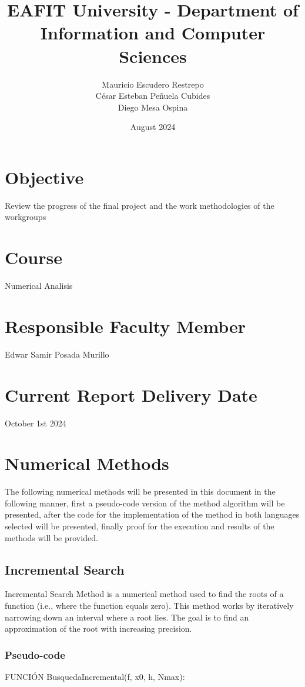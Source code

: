 \documentclass{article}
\title{EAFIT University - Department of Information and Computer Sciences}
\author{Mauricio Escudero Restrepo \\
        César Esteban Peñuela Cubides \\
        Diego Mesa Ospina}
\date{August 2024}
\begin{document}
\maketitle

\section{Objective}
Review the progress of the final project and the work methodologies of the workgroups

\section{Course}
Numerical Analisis

\section{Responsible Faculty Member}
Edwar Samir Posada Murillo

\section{Current Report Delivery Date}
October 1st 2024

\section[]{Numerical Methods}
    The following numerical methods will be presented in this document in the following manner, first a pseudo-code
    version of the method algorithm will be presented, after the code for the implementation of the method in both
    languages selected will be presented, finally proof for the execution and results of the methods will be provided.

    \subsection{Incremental Search}

    Incremental Search Method is a numerical method used to find the roots of a function
    (i.e., where the function equals zero).
    This method works by iteratively narrowing down an interval where a root
    lies.
    The goal is to find an approximation of the root with increasing precision.

        \subsubsection{Pseudo-code}
FUNCIÓN BusquedaIncremental(f, x0, h, Nmax):
\end{document}
